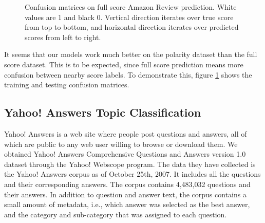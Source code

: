 \documentclass{article}
\begin{document}
\begin{CJK}{UTF8}{gbsn}
\begin{figure}[ht]
  \centering
  \caption{Confusion matrices on full score Amazon Review prediction. White values are 1 and black 0. Vertical direction iterates over true score from top to bottom, and horizontal direction iterates over predicted scores from left to right.}
  \label{fig:amzc}
\end{figure}

It seems that our models work much better on the polarity dataset than the full score dataset. This is to be expected, since full score prediction means more confusion between nearby score labels. To demonstrate this, figure \ref{fig:amzc} shows the training and testing confusion matrices.

\subsection{Yahoo! Answers Topic Classification}

Yahoo! Answers is a web site where people post questions and answers, all of which are public to any web user willing to browse or download them. We obtained Yahoo! Answers Comprehensive Questions and Answers version 1.0 dataset through the Yahoo! Webscope program. The data they have collected is the Yahoo! Answers corpus as of October 25th, 2007. It includes all the questions and their corresponding answers. The corpus contains 4,483,032 questions and their answers. In addition to question and answer text, the corpus contains a small amount of metadata, i.e., which answer was selected as the best answer, and the category and sub-category that was assigned to each question.


\end{CJK}
\end{document}
